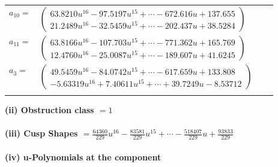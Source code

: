 \documentclass[1p]{elsarticle_modified}
\theoremstyle{definition}
\begin{document}
\begin{tabular}{m{7pt} m{180pt} m{7pt} m{180pt} }
\flushright $a_{10}=$&$\begin{pmatrix}63.8210 u^{16}-97.5197 u^{15}+\cdots-672.616 u+137.655\\21.2489 u^{16}-32.5459 u^{15}+\cdots-202.437 u+38.5284\end{pmatrix}$ \\
\flushright $a_{11}=$&$\begin{pmatrix}63.8166 u^{16}-107.703 u^{15}+\cdots-771.362 u+165.769\\12.4760 u^{16}-25.0087 u^{15}+\cdots-189.607 u+41.6245\end{pmatrix}$ \\
\flushright $a_{3}=$&$\begin{pmatrix}49.5459 u^{16}-84.0742 u^{15}+\cdots-617.659 u+133.808\\-5.63319 u^{16}+7.40611 u^{15}+\cdots+39.7249 u-8.53712\end{pmatrix}$\\&\end{tabular}
\flushleft \textbf{(ii) Obstruction class $= 1$}\\~\\
\flushleft \textbf{(iii) Cusp Shapes $= \frac{64360}{229} u^{16}-\frac{83581}{229} u^{15}+\cdots-\frac{518407}{229} u+\frac{93833}{229}$}\\~\\
\newpage\renewcommand{\arraystretch}{1}
\flushleft \textbf{(iv) u-Polynomials at the component}\newline \\
\end{document}
